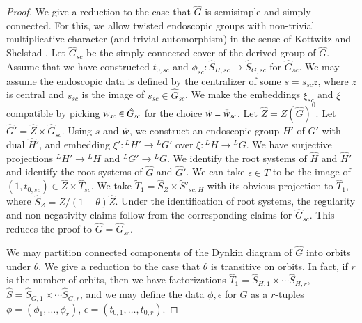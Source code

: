 \begin{proof}
We give a  reduction to the case that $\hat G$ is semisimple and simply-connected.
For this, we allow twisted endoscopic groups with non-trivial multiplicative character (and trivial automorphism) in the sense of Kottwitz and
Shelstad \cite{kottwitz1999foundations}.
Let $\hat G_{sc}$ be the simply connected cover of the derived group of $\hat G$.  
Assume that we have constructed $t_{0,sc}$ and $\phi_{sc}:\hat S_{H,sc}\to \hat S_{G,sc}$ for $\hat G_{sc}$.
We may assume the endoscopic data is defined by the centralizer of some $s = \bar s_{sc} z$,
where $z$ is central and $\bar s_{sc}$ is the image of $s_{sc}\in \hat G_{sc}$.  We make the embeddings $\xi_{sc}$ and $\xi$ compatible by
picking  $\dot w _{sc}\in \hat G_{sc}$ for the choice $\dot w =\bar {\dot w} _{sc}$.
Let $\hat Z = Z(\hat G)^0$.  Let $\hat G' = \hat Z\times \hat G_{sc}$.  Using $s$ and $\dot w$, we construct an endoscopic group $H'$ of $G'$
with dual $\hat H'$, and embedding $\xi':{}^LH' \to {}^LG'$ over $\xi:{}^LH\to {}^LG$.  
We have surjective projections ${}^LH'\to {}^LH$ and
${}^LG'\to {}^LG$.  We identify the root systems of $\hat H$ and $\hat H'$ and identify the root systems of $\hat G$ and $\hat G'$.
We can take $\epsilon\in \hat T$ to be the image of $(1,t_{0,sc})\in \hat Z\times \hat T_{sc}$.
We take $\tilde T_1 = \hat S_Z\times \tilde S'_{sc,H}$ with its obvious projection to $\hat T_1$, where $\hat S_Z = \hat Z/(1-\theta)\hat Z$.
Under the identification of root systems, the regularity and non-negativity claims follow from the corresponding claims for $\hat G_{sc}$.
This  reduces the proof to $\hat G  = \hat G_{sc}$.

We may partition connected components of the Dynkin diagram of $\hat G$ into orbits under $\theta$.
We give a reduction to the case that $\theta$ is transitive on orbits.
In fact, if $r$ is the number of orbits, then we have factorizations $\hat T_1 = \hat S_{H,1} \times\cdots \hat S_{H,r}$, 
$\hat S = \hat S_{G,1}\times\cdots \hat S_{G,r}$, and we may define the data $\phi,\epsilon$ for $\hat G$ as a $r$-tuples
$\phi = (\phi_1,\ldots,\phi_r)$, $\epsilon = (t_{0,1},\ldots,t_{0,r})$.


\end{proof}
